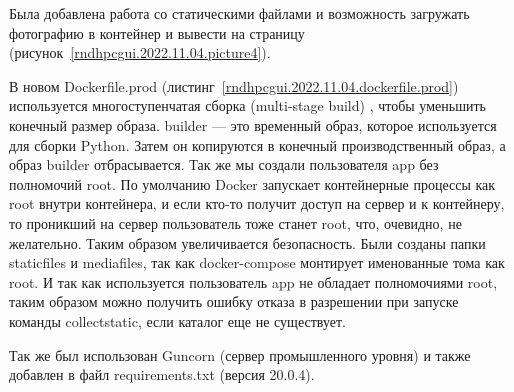 Была добавлена работа со статическими файлами и возможность загружать фотографию в контейнер и вывести на страницу (рисунок~\ref{rndhpcgui.2022.11.04.picture4}).

В новом \textsf{Dockerfile.prod} (листинг~\ref{rndhpcgui.2022.11.04.dockerfile.prod}) используется многоступенчатая сборка (\textsf{multi-stage build}) , чтобы уменьшить конечный размер образа. \textsf{builder} — это временный образ, которое используется для сборки \textsf{Python}. Затем он копируются в конечный производственный образ, а образ \textsf{builder} отбрасывается. Так же мы создали пользователя app без полномочий \textsf{root}. По умолчанию \textsf{Docker} запускает контейнерные процессы как \textsf{root} внутри контейнера, и если кто-то получит доступ на сервер и к контейнеру, то проникший на сервер пользователь тоже станет \textsf{root}, что, очевидно, не желательно. Таким образом увеличивается безопасность. Были созданы папки \textsf{staticfiles} и \textsf{mediafiles}, так как \textsf{docker-compose} монтирует именованные тома как \textsf{root}. И так как используется пользователь \textsf{app} не обладает полномочиями \textsf{root}, таким образом можно получить ошибку отказа в разрешении при запуске команды \textsf{collectstatic}, если каталог еще не существует.
	
Так же был использован \textsf{Guncorn} (сервер промышленного уровня) и также добавлен в файл \textsf{requirements.txt} (версия \textsf{20.0.4}).

